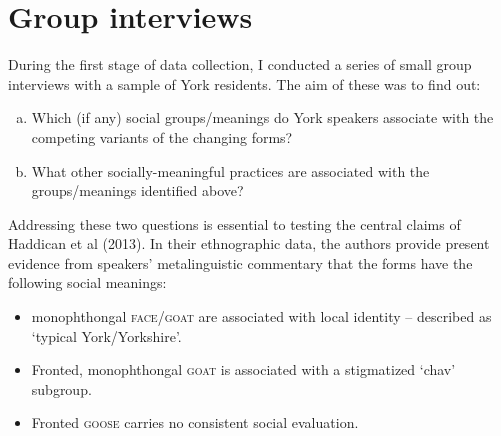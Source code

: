 \documentclass{article}
\begin{document}




\newpage

\section*{Group interviews}

During the first stage of data collection, I conducted a series of small group interviews with a sample of York residents. The aim of these was to find out:

\begin{enumerate}[(a)]
\item{Which (if any) social groups/meanings do York speakers associate with the competing variants of the changing forms?}
\item{What other socially-meaningful practices are associated with the groups/meanings identified above?}
\end{enumerate}

Addressing these two questions is essential to testing the central claims of Haddican et al (2013). In their ethnographic data, the authors provide present evidence from speakers' metalinguistic commentary that the forms have the following social meanings:

\begin{itemize}
\item{monophthongal \textsc{face}/\textsc{goat} are associated with local identity -- described as `typical York/Yorkshire'.}
\item{Fronted, monophthongal \textsc{goat} is associated with a stigmatized `chav' subgroup.}
\item{Fronted \textsc{goose} carries no consistent social evaluation.}
\end{itemize}
\end{document}
